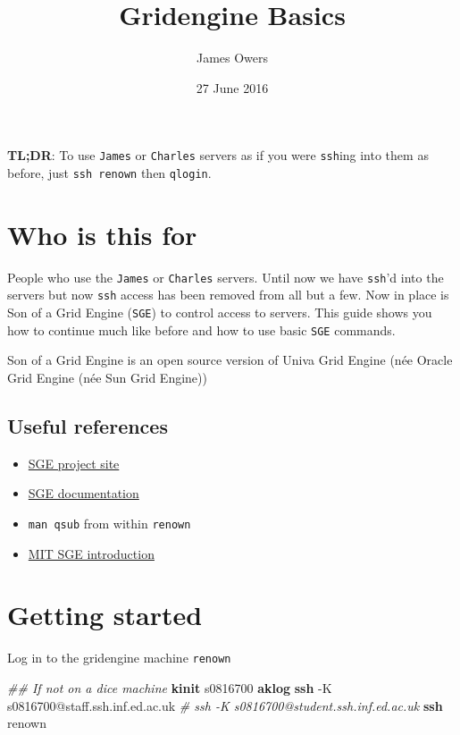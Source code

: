 \documentclass[]{article}
\title{Gridengine Basics}
\author{James Owers}
\date{27 June 2016}
\newenvironment{Shaded}{\begin{snugshade}}{\end{snugshade}}
\newcommand{\KeywordTok}[1]{\textcolor[rgb]{0.13,0.29,0.53}{\textbf{{#1}}}}
\newcommand{\CommentTok}[1]{\textcolor[rgb]{0.56,0.35,0.01}{\textit{{#1}}}}
\newcommand{\NormalTok}[1]{{#1}}
\begin{document}
\maketitle


{
\hypersetup{linkcolor=black}
\setcounter{tocdepth}{2}
\tableofcontents
}
\textbf{TL;DR}: To use \texttt{James} or \texttt{Charles} servers as if
you were \texttt{ssh}ing into them as before, just \texttt{ssh renown}
then \texttt{qlogin}.

\section{Who is this for}\label{who-is-this-for}

People who use the \texttt{James} or \texttt{Charles} servers. Until now
we have \texttt{ssh}'d into the servers but now \texttt{ssh} access has
been removed from all but a few. Now in place is Son of a Grid Engine
(\texttt{SGE}) to control access to servers. This guide shows you how to
continue much like before and how to use basic \texttt{SGE} commands.

Son of a Grid Engine is an open source version of Univa Grid Engine (née
Oracle Grid Engine (née Sun Grid Engine))

\subsection{Useful references}\label{useful-references}

\begin{itemize}
\itemsep1pt\parskip0pt
\item
  \href{https://arc.liv.ac.uk/trac/SGE}{SGE project site}
\item
  \href{http://arc.liv.ac.uk/SGE/htmlman/manuals.html}{SGE
  documentation}
\item
  \texttt{man qsub} from within \texttt{renown}
\item
  \href{http://star.mit.edu/cluster/docs/0.92rc2/guides/sge.html}{MIT
  SGE introduction}
\end{itemize}

\section{Getting started}\label{getting-started}

Log in to the gridengine machine \texttt{renown}

\begin{Shaded}
\begin{Highlighting}[]
\CommentTok{## If not on a dice machine}
\KeywordTok{kinit} \NormalTok{s0816700}
\KeywordTok{aklog}
\KeywordTok{ssh} \NormalTok{-K s0816700@staff.ssh.inf.ed.ac.uk}
\CommentTok{# ssh -K s0816700@student.ssh.inf.ed.ac.uk}
\KeywordTok{ssh} \NormalTok{renown}
\end{Highlighting}
\end{Shaded}
\end{document}

